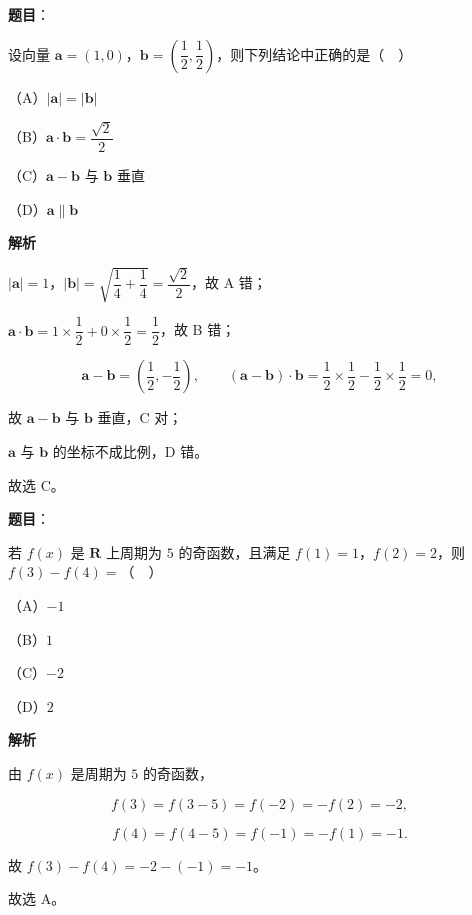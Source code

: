 \begin{answer}

\textbf{题目}：

设向量 $\boldsymbol a=(1,0)$，$\boldsymbol b=\left(\dfrac12,\dfrac12\right)$，则下列结论中正确的是（　）

（A）$|\boldsymbol a|=|\boldsymbol b|$

（B）$\boldsymbol a\cdot\boldsymbol b=\dfrac{\sqrt2}2$

（C）$\boldsymbol a-\boldsymbol b$ 与 $\boldsymbol b$ 垂直

（D）$\boldsymbol a\parallel\boldsymbol b$

\textbf{解析}

$|\boldsymbol a|=1$，$|\boldsymbol b|=\sqrt{\dfrac14+\dfrac14}=\dfrac{\sqrt2}2$，故 A 错；

$\boldsymbol a\cdot\boldsymbol b=1\times\dfrac12+0\times\dfrac12=\dfrac12$，故 B 错；

\nopagebreak[4]
\[\boldsymbol a-\boldsymbol b=\left(\frac12,-\frac12\right),\qquad
(\boldsymbol a-\boldsymbol b)\cdot\boldsymbol b=\frac12\times\frac12-\frac12\times\frac12=0,\]

故 $\boldsymbol a-\boldsymbol b$ 与 $\boldsymbol b$ 垂直，C 对；

$\boldsymbol a$ 与 $\boldsymbol b$ 的坐标不成比例，D 错。

故选 C。


\end{answer}
\begin{answer}

\textbf{题目}：

若 $f(x)$ 是 $\mathbf R$ 上周期为 $5$ 的奇函数，且满足 $f(1)=1$，$f(2)=2$，则 $f(3)-f(4)=$（　）

（A）$-1$

（B）$1$

（C）$-2$

（D）$2$

\textbf{解析}

由 $f(x)$ 是周期为 $5$ 的奇函数，

\nopagebreak[4]
\[f(3)=f(3-5)=f(-2)=-f(2)=-2,\]

\nopagebreak[4]
\[f(4)=f(4-5)=f(-1)=-f(1)=-1.\]

故 $f(3)-f(4)=-2-(-1)=-1$。

故选 A。


\end{answer}
